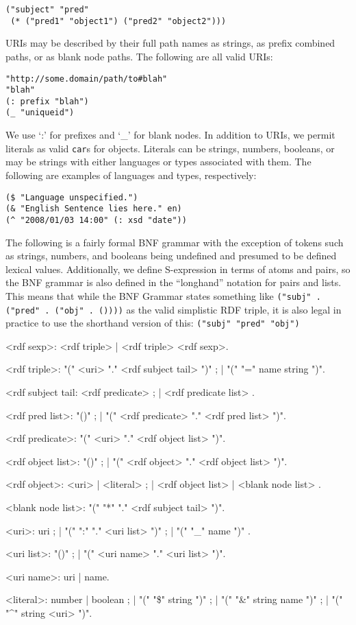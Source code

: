 \documentclass[9pt,cm,twocolumn,preprint]{sigplanconf}
\begin{document}
\begin{verbatim}
("subject" "pred" 
 (* ("pred1" "object1") ("pred2" "object2")))
\end{verbatim}

\noindent URIs may be described by their full path names as strings,
as prefix combined paths, or as blank node paths. The following
are all valid URIs:

\begin{verbatim}
"http://some.domain/path/to#blah"
"blah"
(: prefix "blah")
(_ "uniqueid")
\end{verbatim}

\noindent We use `:' for prefixes and `\_' for blank nodes.
In addition to URIs, we permit literals as valid {\tt car}s for objects.
Literals can be strings, numbers, booleans, or may be strings
with either languages or types associated with them. The following
are examples of languages and types, respectively:

\begin{verbatim}
($ "Language unspecified.")
(& "English Sentence lies here." en)
(^ "2008/01/03 14:00" (: xsd "date"))
\end{verbatim}

\noindent The following is a fairly formal BNF grammar with the exception of
tokens such as strings, numbers, and booleans being undefined and
presumed to be defined lexical values. Additionally, we define
S-expression in terms of atoms and pairs, so the BNF grammar is
also defined in the ``longhand'' notation for pairs and lists.
This means that while the BNF Grammar states something
like {\tt ("subj" . ("pred" . ("obj" . ())))} as the
valid simplistic RDF triple, it is also legal in practice to use
the shorthand version of this: {\tt ("subj" "pred" "obj")}

\begingroup\narrower
\begingrammar
%
<rdf sexp>:     <rdf triple> | <rdf triple> <rdf sexp>.\par

<rdf triple>:   "(" <uri> "." <rdf subject tail> ")" ; | "(" "=" name string ")".

<rdf subject tail: <rdf predicate> ; | <rdf predicate list> .

<rdf pred list>: "()" ; | "(" <rdf predicate> "." <rdf pred list> ")".

<rdf predicate>: "(" <uri> "." <rdf object list> ")".

<rdf object list>: "()" ; | "(" <rdf object> "." <rdf object list> ")".

<rdf object>: <uri> | <literal>
        ; | <rdf object list> | <blank node list> .

<blank node list>: "(" "*" "." <rdf subject tail> ")".

<uri>: uri ; | "(" ":" "." <uri list> ")" ; | "(" "\_" name ")" .

<uri list>: "()" ; | "(" <uri name> "." <uri list> ")".

<uri name>: uri | name.

<literal>: number | boolean ; | "(" "\$" string ")" ; |
        "(" "\&" string name ")" ; | "(" "\^{}" string <uri> ")".

\endgrammar
\endgroup
\endgroup
\medskip
\end{document}
